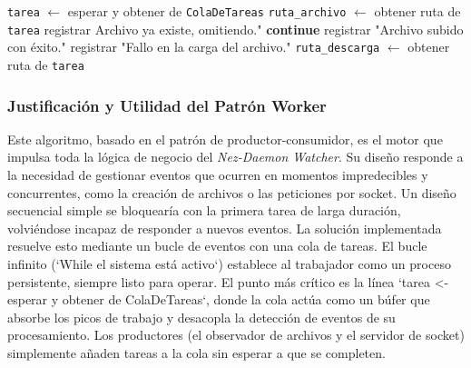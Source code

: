\begin{algorithm}
\caption{Procesamiento de Tareas del Trabajador}
\label{algo:worker}
\begin{algorithmic}[1]
    \State \texttt{tarea} $\leftarrow$ esperar y obtener de \texttt{ColaDeTareas}
        \State \texttt{ruta\_archivo} $\leftarrow$ obtener ruta de \texttt{tarea}
            \State {}
        \Else
            \State {}
                \State registrar Archivo ya existe, omitiendo."
                \State \textbf{continue}
            \EndIf
                 \State registrar "Archivo subido con éxito."
            \Else
                 \State registrar "Fallo en la carga del archivo."
                 \State {}
            \EndIf
        \EndIf
        \State \texttt{ruta\_descarga} $\leftarrow$ obtener ruta de \texttt{tarea}
        \State {}
    \EndIf
\EndWhile
\end{algorithmic}
\end{algorithm}

\subsubsection{Justificación y Utilidad del Patrón Worker}
Este algoritmo, basado en el patrón de productor-consumidor, es el motor que impulsa toda la lógica de negocio del \textit{Nez-Daemon Watcher}. Su diseño responde a la necesidad de gestionar eventos que ocurren en momentos impredecibles y concurrentes, como la creación de archivos o las peticiones por socket. Un diseño secuencial simple se bloquearía con la primera tarea de larga duración, volviéndose incapaz de responder a nuevos eventos. La solución implementada resuelve esto mediante un bucle de eventos con una cola de tareas. El bucle infinito (`While el sistema está activo`) establece al trabajador como un proceso persistente, siempre listo para operar. El punto más crítico es la línea `tarea <- esperar y obtener de ColaDeTareas`, donde la cola actúa como un búfer que absorbe los picos de trabajo y desacopla la detección de eventos de su procesamiento. Los productores (el observador de archivos y el servidor de socket) simplemente añaden tareas a la cola sin esperar a que se completen. 


